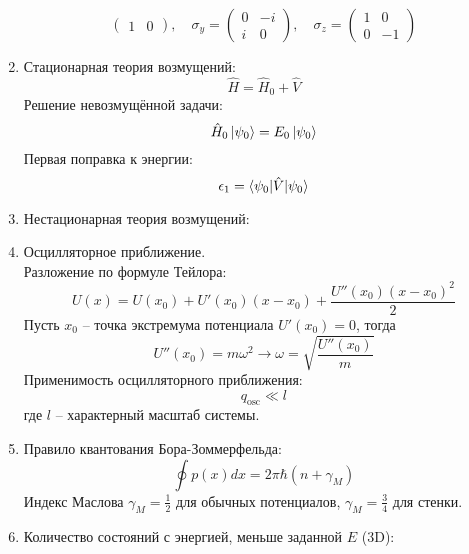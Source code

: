 \documentclass[12pt]{article}
\theoremstyle{definition}
\begin{document}
\begin{enumerate}
\begin{equation}
\begin{pmatrix}
        1 & 0
        \end{pmatrix},\quad\sigma_y=\begin{pmatrix}
        0 & -i\\
        i & 0
        \end{pmatrix},\quad\sigma_z=\begin{pmatrix}
        1 & 0\\
        0 & -1
        \end{pmatrix}
    \end{equation}
    \item Стационарная теория возмущений:
    \begin{equation}
        \hat{H}=\hat{H}_0+\hat{V}
    \end{equation}
    Решение невозмущённой задачи:
    \begin{equation}
        \hat{H}_0\ket{\psi_0}=E_0\ket{\psi_0}
    \end{equation}
    Первая поправка к энергии:
    \begin{equation}
        \epsilon_1=\braket{\psi_0|\hat{V}|\psi_0}
    \end{equation}
    \item Нестационарная теория возмущений:
    \item Осцилляторное приближение.\\
    Разложение по формуле Тейлора:
    \begin{equation}
        U(x)=U(x_0)+U'(x_0)(x-x_0)+\frac{U''(x_0)(x-x_0)^2}{2}
    \end{equation}
    Пусть $x_0$ -- точка экстремума потенциала $U'(x_0)=0$, тогда
    \begin{equation}
        U''(x_0)=m\omega^2\rightarrow\omega=\sqrt{\frac{U''(x_0)}{m}}
    \end{equation}
    Применимость осцилляторного приближения:
    \begin{equation}
        q_\text{osc}\ll l
    \end{equation}
    где $l$ -- характерный масштаб системы.
    \item Правило квантования Бора-Зоммерфельда:
    \begin{equation}
        \oint p(x)dx=2\pi\hbar\left(n+\gamma_M\right)
    \end{equation}
    Индекс Маслова $\gamma_M=\frac{1}{2}$ для обычных потенциалов, $\gamma_M=\frac{3}{4}$ для стенки.
    \item Количество состояний с энергией, меньше заданной $E$ (3D):
    \begin{equation}

\end{equation}
\end{enumerate}
\end{document}
